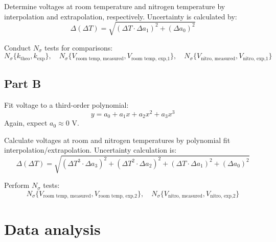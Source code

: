 \documentclass[12pt,a4paper]{report}
\begin{document}
Determine voltages at room temperature and nitrogen temperature by interpolation and extrapolation, respectively. Uncertainty is calculated by:
\[
\Delta(\Delta T) = \sqrt{(\Delta T \cdot \Delta a_1)^2 + (\Delta a_0)^2}
\]

Conduct $N_\sigma$ tests for comparisons:
\[
N_\sigma\{k_{\text{theo}}, k_{\text{exp}}\}, \quad
N_\sigma\{V_{\text{room temp, measured}}, V_{\text{room temp, exp,1}}\}, \quad
N_\sigma\{V_{\text{nitro, measured}}, V_{\text{nitro, exp,1}}\}
\]

\subsection{Part B}
Fit voltage to a third-order polynomial:
\[
y = a_0 + a_1 x + a_2 x^2 + a_3 x^3
\]
Again, expect $a_0 \approx 0$ V.

Calculate voltages at room and nitrogen temperatures by polynomial fit interpolation/extrapolation. Uncertainty calculation is:
\[
\Delta(\Delta T) = \sqrt{(\Delta T^3 \cdot \Delta a_3)^2 + (\Delta T^2 \cdot \Delta a_2)^2 + (\Delta T \cdot \Delta a_1)^2 + (\Delta a_0)^2}
\]

Perform $N_\sigma$ tests:
\[
N_\sigma\{V_{\text{room temp, measured}}, V_{\text{room temp, exp,2}}\}, \quad
N_\sigma\{V_{\text{nitro, measured}}, V_{\text{nitro, exp,2}}\}
\]

\pagebreak
\section{Data analysis}
\end{document}
